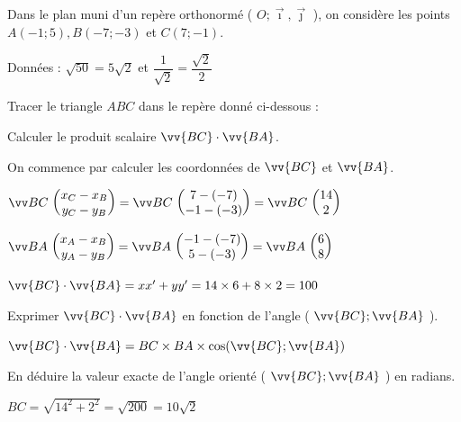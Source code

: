 \documentclass[12pt,a4paper]{article}  %
\begin{document}
\newpage
{}
Dans le plan muni d'un repère orthonormé ( $O ; \vec{\imath}, \vec{\jmath}$ ), on considère les points $A(-1 ; 5), B(-7 ; -3)$ et $C(7 ;-1)$.

Données : $\sqrt{50}=5 \sqrt{2}$ et $\dfrac{1}{\sqrt{2}}=\dfrac{\sqrt{2}}{2}$

\begin{enumMet}
	\item Tracer le triangle $A B C$ dans le repère donné ci-dessous :
	
	\begin{center}
	\end{center}
	\item Calculer le produit scalaire $\vv{B C} \cdot \vv{B A}$.
	\begin{corrBox}
		On commence par calculer les coordonnées de $\vv{B C}$ et $\vv{B A}$.
		
		$\Coord{BC}{x_C-x_B}{y_C-y_B}=\Coord{BC}{7-(-7)}{-1-(-3)}=\Coord{BC}{14}{2}$
		
		$\Coord{BA}{x_A-x_B}{y_A-y_B}=\Coord{BA}{-1-(-7)}{5-(-3)}=\Coord{BA}{6}{8}$
		
		$\vv{B C} \cdot \vv{B A}=xx'+yy'=14\times 6+8\times 2=100$		
	\end{corrBox}
	\item \begin{enumMet}
		\item Exprimer $\vv{B C} \cdot \vv{B A}$ en fonction de l'angle ( $\vv{B C} ; \vv{B A}$ ).
		\begin{corrBox}
			$\vv{B C} \cdot \vv{B A}=BC\times BA\times \cos( \vv{B C} ; \vv{B A} )$		
		\end{corrBox}
		\item En déduire la valeur exacte de l'angle orienté ( $\vv{B C} ; \vv{B A}$ ) en radians.
		\begin{corrBox}
			$BC=\sqrt{14^2+2^2}=\sqrt{200}=10\sqrt{2}$
			

\end{corrBox}
\end{enumMet}
\end{enumMet}
\end{document}
